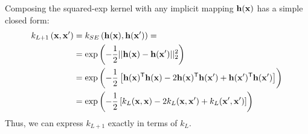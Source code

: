 Composing the squared-exp kernel with any implicit mapping ${\bf{h}}({\bf{x}})$ has a simple closed form:
%
\begin{align}
k_{L+1} \left( {\bf{x}}, {\bf{x}}' \right) & = k_{SE} \left( {\bf{h}}({\bf{x}}), {\bf{h}}({\bf{x}}') \right) =  \\
& = \exp \left( -\frac{1}{2} || {\bf{h}}({\bf{x}}) - {\bf{h}}({\bf{x}}')||_2^2 \right) \nonumber\\
& = \exp\left ( -\frac{1}{2} \left[ {\bf{h}}({\bf{x}}) {^\mathsf{T}} {\bf{h}}({\bf{x}}) - 2 {\bf{h}}({\bf{x}}) {^\mathsf{T}} {\bf{h}}({\bf{x}}') + {\bf{h}}({\bf{x}}') {^\mathsf{T}} {\bf{h}}({\bf{x}}') \right] \right) \nonumber \\
& = \exp \left( -\frac{1}{2} \left[ k_{L}({\bf{x}}, {\bf{x}}) - 2 k_{L}({\bf{x}}, {\bf{x}}') + k_{L}({\bf{x}}', {\bf{x}}') \right] \right) \nonumber
\end{align}
%
%
%
Thus, we can express $k_{L+1}$ exactly in terms of $k_L$.


